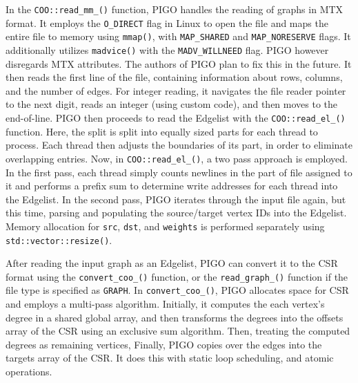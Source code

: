 In the \texttt{COO::read\_mm\_()} function, PIGO handles the reading of graphs in MTX format. It employs the \texttt{O\_DIRECT} flag in Linux to open the file and maps the entire file to memory using \texttt{mmap()}, with \texttt{MAP\_SHARED} and \texttt{MAP\_NORESERVE} flags. It additionally utilizes \texttt{madvice()} with the \texttt{MADV\_WILLNEED} flag. PIGO however disregards MTX attributes. The authors of PIGO plan to fix this in the future. It then reads the first line of the file, containing information about rows, columns, and the number of edges. For integer reading, it navigates the file reader pointer to the next digit, reads an integer (using custom code), and then moves to the end-of-line. PIGO then proceeds to read the Edgelist with the \texttt{COO::read\_el\_()} function. Here, the split is split into equally sized parts for each thread to process. Each thread then adjusts the boundaries of its part, in order to eliminate overlapping entries. Now, in \texttt{COO::read\_el\_()}, a two pass approach is employed. In the first pass, each thread simply counts newlines in the part of file assigned to it and performs a prefix sum to determine write addresses for each thread into the Edgelist. In the second pass, PIGO iterates through the input file again, but this time, parsing and populating the source/target vertex IDs into the Edgelist. Memory allocation for \texttt{src}, \texttt{dst}, and \texttt{weights} is performed separately using \texttt{std::vector::resize()}.

After reading the input graph as an Edgelist, PIGO can convert it to the CSR format using the \texttt{convert\_coo\_()} function, or the \texttt{read\_graph\_()} function if the file type is specified as \texttt{GRAPH}. In \texttt{convert\_coo\_()}, PIGO allocates space for CSR and employs a multi-pass algorithm. Initially, it computes the each vertex's degree in a shared global array, and then transforms the degrees into the offsets array of the CSR using an exclusive sum algorithm. Then, treating the computed degrees as remaining vertices, Finally, PIGO copies over the edges into the targets array of the CSR. It does this with static loop scheduling, and atomic operations.

